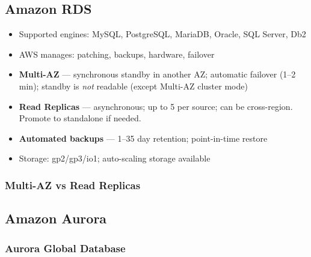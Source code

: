 

\subsection{Amazon RDS}

\begin{keyfacts}
\begin{itemize}
  \item Supported engines: MySQL, PostgreSQL, MariaDB, Oracle, SQL Server, Db2
  \item AWS manages: patching, backups, hardware, failover
  \item \textbf{Multi-AZ} — synchronous standby in another AZ; automatic failover
        (1–2 min); standby is \emph{not} readable (except Multi-AZ cluster mode)
  \item \textbf{Read Replicas} — asynchronous; up to 5 per source; can be cross-region.
        Promote to standalone if needed.
  \item \textbf{Automated backups} — 1–35 day retention; point-in-time restore
  \item Storage: gp2/gp3/io1; auto-scaling storage available
\end{itemize}
\end{keyfacts}

\subsubsection{Multi-AZ vs Read Replicas}

\subsection{Amazon Aurora}


\subsubsection{Aurora Global Database}

